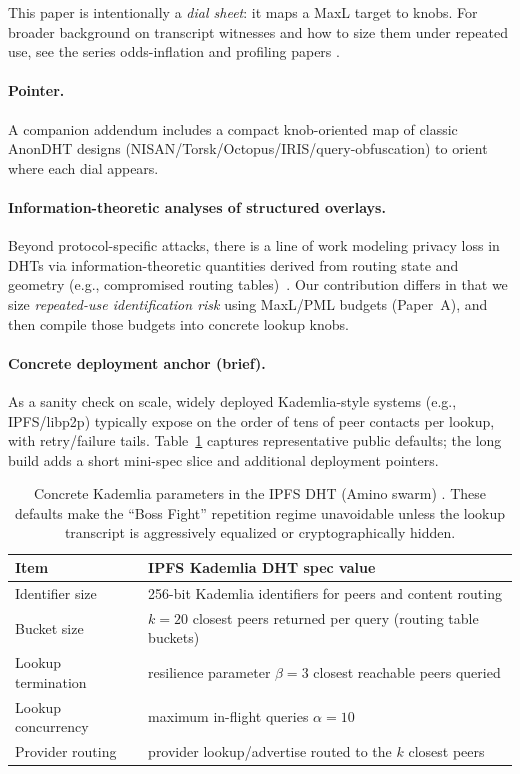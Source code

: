 \documentclass[11pt]{article}
\begin{document}
This paper is intentionally a \emph{dial sheet}: it maps a MaxL target to knobs.
For broader background on transcript witnesses and how to size them under repeated use, see the series odds-inflation and profiling papers \cite{series:oddsinflation,series:profiling}.
\paragraph{Pointer.} A companion addendum includes a compact knob-oriented map of classic AnonDHT designs (NISAN/Torsk/Octopus/IRIS/query-obfuscation) to orient where each dial appears.
\cite{series:bossfightBaddendum}




\paragraph{Information-theoretic analyses of structured overlays.}
Beyond protocol-specific attacks, there is a line of work modeling privacy loss in DHTs via information-theoretic quantities derived from routing state and geometry (e.g., compromised routing tables)~\cite{ray2007framework}.
Our contribution differs in that we size \emph{repeated-use identification risk} using MaxL/PML budgets (Paper~A), and then compile those budgets into concrete lookup knobs.

\paragraph{Concrete deployment anchor (brief).}
As a sanity check on scale, widely deployed Kademlia-style systems (e.g., IPFS/libp2p) typically expose on the order of tens of peer contacts per lookup, with retry/failure tails.
Table~\ref{tab:ipfs-kad-params} captures representative public defaults; the long build adds a short mini-spec slice and additional deployment pointers.

\begin{table}[t]
\centering
\caption{Concrete Kademlia parameters in the IPFS DHT (Amino swarm) \cite{ipfs_kad_spec}. These defaults make the ``Boss Fight'' repetition regime unavoidable unless the lookup transcript is aggressively equalized or cryptographically hidden.}
\label{tab:ipfs-kad-params}
\begin{tabular}{@{}ll@{}}
\toprule
Item & IPFS Kademlia DHT spec value \\ \midrule
Identifier size & 256-bit Kademlia identifiers for peers and content routing \\
Bucket size & $k=20$ closest peers returned per query (routing table buckets) \\
Lookup termination & resilience parameter $\beta=3$ closest reachable peers queried \\
Lookup concurrency & maximum in-flight queries $\alpha=10$ \\
Provider routing & provider lookup/advertise routed to the $k$ closest peers \\ \bottomrule
\end{tabular}
\end{table}
\end{document}
